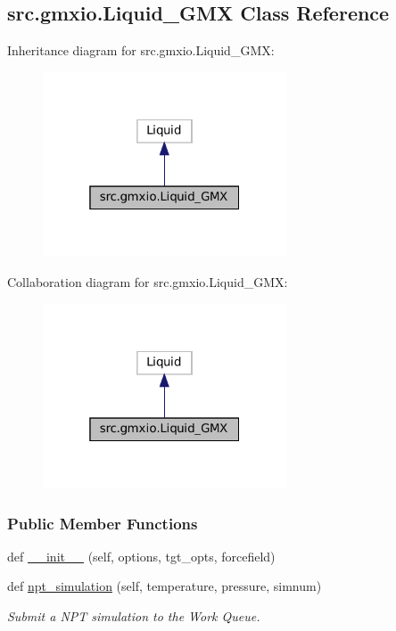 \hypertarget{classsrc_1_1gmxio_1_1Liquid__GMX}{}\subsection{src.\+gmxio.\+Liquid\+\_\+\+G\+MX Class Reference}
\label{classsrc_1_1gmxio_1_1Liquid__GMX}


Inheritance diagram for src.\+gmxio.\+Liquid\+\_\+\+G\+MX\+:
\nopagebreak
\begin{figure}[H]
\begin{center}
\leavevmode
\includegraphics[width=205pt]{classsrc_1_1gmxio_1_1Liquid__GMX__inherit__graph}
\end{center}
\end{figure}


Collaboration diagram for src.\+gmxio.\+Liquid\+\_\+\+G\+MX\+:
\nopagebreak
\begin{figure}[H]
\begin{center}
\leavevmode
\includegraphics[width=205pt]{classsrc_1_1gmxio_1_1Liquid__GMX__coll__graph}
\end{center}
\end{figure}
\subsubsection*{Public Member Functions}
\begin{DoxyCompactItemize}
\item 
def \hyperlink{classsrc_1_1gmxio_1_1Liquid__GMX_a4084ac631cf4924a9ff202a5ee6c501e}{\+\_\+\+\_\+init\+\_\+\+\_\+} (self, options, tgt\+\_\+opts, forcefield)
\item 
def \hyperlink{classsrc_1_1gmxio_1_1Liquid__GMX_a6ddb76474e47e2bb1ba6ed2b58f1b29e}{npt\+\_\+simulation} (self, temperature, pressure, simnum)
\begin{DoxyCompactList}\small\item\em Submit a N\+PT simulation to the Work Queue. \end{DoxyCompactList}\end{DoxyCompactItemize}
